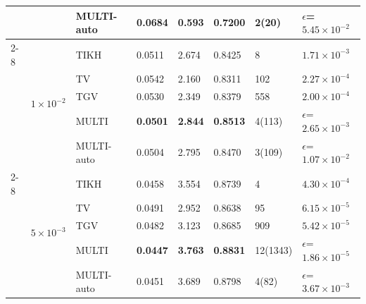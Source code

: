 \begin{tabular}{llllllll}
 &  & MULTI-auto & 0.0684 & 0.593 & 0.7200 & 2(20) & $\epsilon$=$5.45\times 10^{-2}$ \\
\cmidrule{2-8}
 & \multirow{5}{*}{$1\times 10^{-2}$} & TIKH & 0.0511 & 2.674 & 0.8425 & 8 & $1.71\times 10^{-3}$ \\
 &  & TV & 0.0542 & 2.160 & 0.8311 & 102 & $2.27\times 10^{-4}$ \\
 &  & TGV & 0.0530 & 2.349 & 0.8379 & 558 & $2.00\times 10^{-4}$ \\
 &  & MULTI & \textbf{0.0501} & \textbf{2.844} & \textbf{0.8513} & 4(113) & $\epsilon$=$2.65\times 10^{-3}$ \\
 &  & MULTI-auto & 0.0504 & 2.795 & 0.8470 & 3(109) & $\epsilon$=$1.07\times 10^{-2}$ \\
\cmidrule{2-8}
 & \multirow{5}{*}{$5\times 10^{-3}$} & TIKH & 0.0458 & 3.554 & 0.8739 & 4 & $4.30\times 10^{-4}$ \\
 &  & TV & 0.0491 & 2.952 & 0.8638 & 95 & $6.15\times 10^{-5}$ \\
 &  & TGV & 0.0482 & 3.123 & 0.8685 & 909 & $5.42\times 10^{-5}$ \\
 &  & MULTI & \textbf{0.0447} & \textbf{3.763} & \textbf{0.8831} & 12(1343) & $\epsilon$=$1.86\times 10^{-5}$ \\
 &  & MULTI-auto & 0.0451 & 3.689 & 0.8798 & 4(82) & $\epsilon$=$3.67\times 10^{-3}$ \\
\bottomrule
\end{tabular}